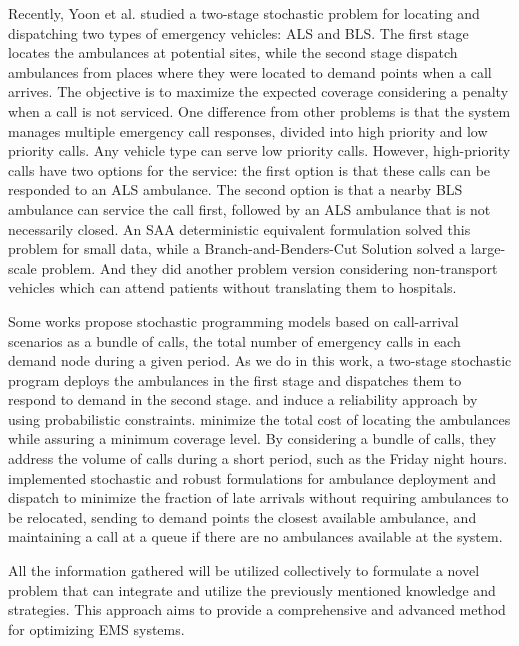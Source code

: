 Recently, Yoon et al. \cite{yoon2021stochastic} studied a two-stage stochastic problem for locating and dispatching two types of emergency vehicles: ALS and BLS. The first stage locates the ambulances at potential sites, while the second stage dispatch ambulances from places where they were located to demand points when a call arrives. The objective is to maximize the expected coverage considering a penalty when a call is not serviced. One difference from other problems is that the system manages multiple emergency call responses, divided into high priority and low priority calls. Any vehicle type can serve low priority calls. However, high-priority calls have two options for the service: the first option is that these calls can be responded to an ALS ambulance. The second option is that a nearby BLS ambulance can service the call first, followed by an ALS ambulance that is not necessarily closed. An SAA deterministic equivalent formulation solved this problem for small data, while a Branch-and-Benders-Cut Solution solved a large-scale problem. And they did another problem version considering non-transport vehicles which can attend patients without translating them to hospitals.

Some works propose stochastic programming models based on call-arrival sce\-na\-rios as a bundle of calls, the total number of emergency calls in each demand node during a given period. As we do in this work, a two-stage stochastic program deploys the ambulances in the first stage and dispatches them to respond to demand in the second stage. \citet{beraldi2009probabilistic} and \citet{noyan2010alternate} induce a reliability approach by using probabilistic constraints. \citet{nickel2016ambulance} minimize the total cost of locating the ambulances while assuring a minimum coverage level. By considering a bundle of calls, they address the volume of calls during a short period, such as the Friday night hours. \citet{bertsimas2019robust} implemented stochastic and robust formulations for ambulance deployment and dispatch to minimize the fraction of late arrivals without requiring ambulances to be relocated, sending to demand points the closest available ambulance, and maintaining a call at a queue if there are no ambulances available at the system. 

All the information gathered will be utilized collectively to formulate a novel problem that can integrate and utilize the previously mentioned knowledge and strategies. This approach aims to provide a comprehensive and advanced method for optimizing EMS systems.


